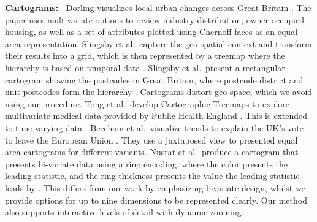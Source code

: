 \textbf{Cartograms:~}
Dorling visualizes local urban changes across Great Britain \cite{dorling1995visualization}. The paper uses multivariate options to review industry distribution, owner-occupied housing, as well as a set of attributes plotted using Chernoff faces as an equal area representation.
Slingsby et al.\ capture the geo-spatial context and transform their results into a grid, which is then represented by a treemap where the hierarchy is based on temporal data \cite{slingsby2010treemap}.
 Slingsby et al.\ present a rectangular cartogram showing the postcodes in Great Britain, where postcode district and unit postcodes form the hierarchy \cite{slingsby2010rectangular}. Cartograms distort geo-space, which we avoid using our procedure.
Tong et al.\ develop Cartographic Treemaps to explore multivariate medical data provided by Public Health England \cite{tong2017cartographic}. This is extended to time-varying data \cite{tong2017time}. 
Beecham et al.\ visualize trends to explain the UK's vote to leave the European Union  \cite{beecham2018locally}. They use a juxtaposed view to presented equal area cartograms for different variants. 
Nusrat et al.\ produce a cartogram that presents bi-variate data using a ring encoding, where the color presents the leading statistic, and the ring thickness presents the value the leading statistic leads by \cite{nusrat2018cartogram}. This differs from our work by emphasizing bivariate design, whilst we provide options for up to nine dimensions to be represented clearly. Our method also supports interactive levels of detail with dynamic zooming.

